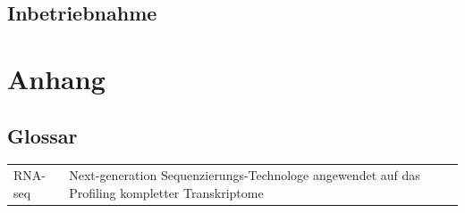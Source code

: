 \documentclass[a4paper]{thesis}
\begin{document}
\subsection{Inbetriebnahme}

\section{Anhang}

\subsection{Glossar}

\begin{tabularx}{\textwidth}{lX}
	  RNA-seq
	& Next-generation Sequenzierungs-Technologe angewendet auf
          das Profiling kompletter Transkriptome
\\
\end{tabularx}

{
	\renewcommand\listfigurename{Abbildungsverzeichnis}
	\tocsection{}\listoffigures
}

\nocite{*}
\ifxetex
	\printbibliography[
		title=Quellenverzeichnis,
		heading=subbibnumbered,
	]
\else
	
	
\if
\end{document}
